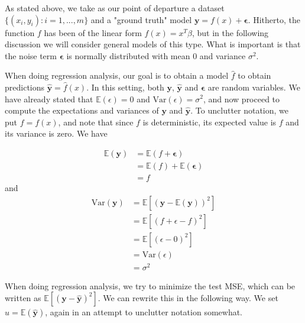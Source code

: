 \documentclass{article}
\begin{document}
As stated above, we take as our point of departure a dataset $\{(x_i, y_i): i=1, ..., m\}$ and a "ground truth" model $\mathbf{y} = f(x) + \mathbf{\epsilon}$. Hitherto, the function $f$ has been of the linear form $f(x) = {x}^T \beta$, but in the following discussion we will consider general models of this type. What is important is that the noise term $\mathbf{\epsilon}$ is normally distributed with mean 0 and variance ${\sigma}^2$.

When doing regression analysis, our goal is to obtain a model $\hat{f}$ to obtain predictions $\hat{\mathbf{y}} = \hat{f}(x)$. In this setting, both $\mathbf{y}$, $\mathbf{\hat{y}}$ and $\mathbf{\epsilon}$ are random variables. We have already stated that $\mathbb{E}{(\epsilon)}=0$ and $\mathrm{Var}{(\epsilon)} = {\sigma}^2$, and now proceed to compute the expectations and variances of $\mathbf{y}$ and $\mathbf{\hat{y}}$. To unclutter notation, we put $f=f(x)$, and note that since $f$ is deterministic, its expected value is $f$ and its variance is zero. We have

\begin{align*}
    \mathbb{E}{(\mathbf{y})}
    &=  \mathbb{E}({f + \mathbf{\epsilon}}) \\
    &= \mathbb{E}{(f)} + \mathbb{E}{(\mathbf{\epsilon})} \\
    &= f
\end{align*}
and
\begin{align*}
    \mathrm{Var}(\mathbf{y})
    &= \mathbb{E}[(\mathbf{y} - \mathbb{E}(\mathbf{y}))^2] \\
    &= \mathbb{E}[(f+\epsilon-f)^2] \\
    &= \mathbb{E}[(\epsilon - 0)^2] \\
    &= \mathrm{Var}(\epsilon) \\
    &= \sigma^2
\end{align*}

When doing regression analysis, we try to minimize the test MSE, which can be written as $\mathbb{E}[(\mathbf{y} - \mathbf{\hat{y}})^2]$. We can rewrite this in the following way. We set $u=\mathbb{E}(\hat{\mathbf{y}})$, again in an attempt to unclutter notation somewhat.
\end{document}
